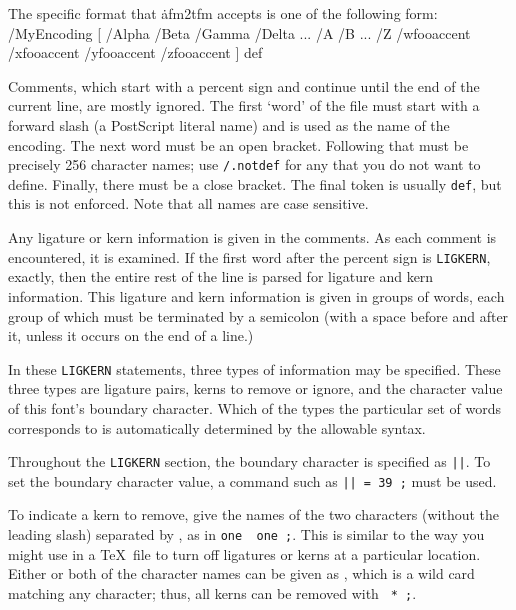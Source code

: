 The specific format that \.{afm2tfm} accepts is one of the following
form:
{\vskip0pt\parskip=0pt
/MyEncoding [ /Alpha /Beta /Gamma /Delta ...
     /A /B ... /Z %
     /wfooaccent /xfooaccent /yfooaccent /zfooaccent ] def
\endverb}

Comments, which start with a percent sign and continue until the
end of the current line, are mostly ignored.  The first `word' of
the file must start with a forward slash (a PostScript literal
name) and is used as the name of the encoding.	The next word must
be an open bracket.  Following that must be precisely 256 character
names; use {\tt /.notdef} for any that you do not want to define.
Finally, there must be a close bracket.  The final token is usually
{\tt def}, but this is not enforced.  Note that all names are
case sensitive.

Any ligature or kern information is given in the comments.  As each
comment is encountered, it is examined.  If the first word after the
percent sign is {\tt LIGKERN}, exactly, then the entire rest of the
line is parsed for ligature and kern information.  This ligature and
kern information is given in groups of words, each group of which must
be terminated by a semicolon (with a space before and after it, unless
it occurs on the end of a line.)

In these {\tt LIGKERN} statements, three types of information may be
specified.  These three types are ligature pairs, kerns to remove or
ignore, and the character value of this font's boundary character.
Which of the types the particular set of words corresponds to is
automatically determined by the allowable syntax.

Throughout the {\tt LIGKERN} section, the boundary character is
specified as {\tt ||}.
To set the boundary character value, a command such as
{\tt || = 39 ;} must be used.

To indicate a kern to remove, give the names of the two characters
(without the leading slash) separated by {\tt {}}, as in
{\tt one \ one ;}.  This is similar to the way you
might use {\tt {}} in a \TeX\ file to turn off ligatures
or kerns at a particular location.  Either or both of the character
names can be given as {\tt *}, which is a wild card matching any
character; thus, all kerns can be removed with {\tt *
\ * ;}.


